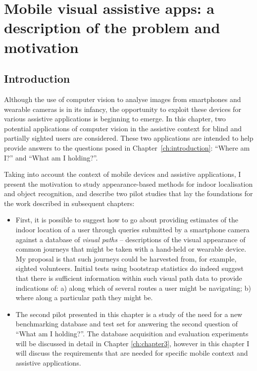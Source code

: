 \chapter{Mobile visual assistive apps: a description of the problem and motivation}\label{ch:chapter2}

\section{Introduction}

Although the use of computer vision to analyse images from smartphones and wearable cameras is in its infancy, the opportunity to exploit these devices for various assistive applications is beginning to emerge. In this chapter, two potential applications of computer vision in the assistive context for blind and partially sighted users are considered. These two applications are intended to help provide answers to the questions posed in Chapter~\ref{ch:introduction}: ``Where am I?'' and ``What am I holding?''.

Taking into account the context of mobile devices and assistive applications, I present the motivation to study appearance-based methods for indoor localisation and object recognition, and describe two pilot studies that lay the foundations for the work described in subsequent chapters:

\begin{itemize}
\item First, it is possible to suggest how to go about providing estimates of the indoor location of a user through queries submitted by a smartphone camera against a database of \textit{visual paths} -- descriptions of the visual appearance of common journeys that might be taken with a hand-held or wearable device. My proposal is that such journeys could be harvested from, for example, sighted volunteers. Initial tests using bootstrap statistics do indeed suggest that there is sufficient information within such visual path data to provide indications of: a) along which of several routes a user might be navigating; b) where along a particular path they might be.
\item The second pilot presented in this chapter is a study of the need for a new benchmarking database and test set for answering the second question of ``What am I holding?''. The database acquisition and evaluation experiments will be discussed in detail in Chapter \ref{ch:chapter3}, however in this chapter I will discuss the requirements that are needed for specific mobile context and assistive applications.
\end{itemize}



